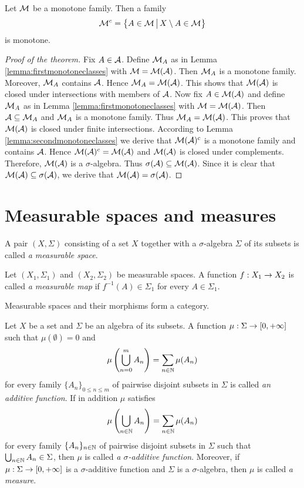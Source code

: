 \begin{lemma}\label{lemma:secondmonotoneclasses}
Let ${\mathcal M}$ be a monotone family. Then a family
$${\mathcal M}^c=\big\{A\in {\mathcal M}\,\big|\,X\setminus A\in {\mathcal M}\big\}$$
is monotone.
\end{lemma}

\begin{proof}[Proof of the theorem]
Fix $A\in {\mathcal A}$. Define ${\mathcal M}_A$ as in Lemma \ref{lemma:firstmonotoneclasses} with ${\mathcal M} = {\mathcal M}({\mathcal A})$. Then ${\mathcal M}_A$ is a monotone family. Moreover, ${\mathcal M}_A$ contains ${\mathcal A}$. Hence ${\mathcal M}_A={\mathcal M}({\mathcal A})$. This shows that ${\mathcal M}({\mathcal A})$ is closed under intersections with members of ${\mathcal A}$. Now fix $A\in {\mathcal M}({\mathcal A})$ and define ${\mathcal M}_A$ as in Lemma \ref{lemma:firstmonotoneclasses} with ${\mathcal M} = {\mathcal M}({\mathcal A})$. Then ${\mathcal A}\subseteq {\mathcal M}_A$ and ${\mathcal M}_A$ is a monotone family. Thus ${\mathcal M}_A={\mathcal M}({\mathcal A})$. This proves that ${\mathcal M}({\mathcal A})$ is closed under finite intersections. According to Lemma \ref{lemma:secondmonotoneclasses} we derive that ${\mathcal M}({\mathcal A})^c$ is a monotone family and contains ${\mathcal A}$. Hence ${\mathcal M}({\mathcal A})^c={\mathcal M}({\mathcal A})$ and ${\mathcal M}({\mathcal A})$ is closed under complements. Therefore, ${\mathcal M}({\mathcal A})$ is a $\sigma$-algebra. Thus $\sigma({\mathcal A})\subseteq {\mathcal M}({\mathcal A})$. Since it is clear that ${\mathcal M}({\mathcal A})\subseteq \sigma({\mathcal A})$, we derive that ${\mathcal M}({\mathcal A})=\sigma({\mathcal A})$.
\end{proof}

\section{Measurable spaces and measures}

\begin{definition}
A pair $(X,\Sigma)$ consisting of a set $X$ together with a $\sigma$-algebra $\Sigma$ of its subsets is called \textit{a measurable space}.
\end{definition}

\begin{definition}
Let $(X_1,\Sigma_1)$ and $(X_2,\Sigma_2)$ be measurable spaces. A function $f:X_1\rightarrow X_2$ is called \textit{a measurable map} if $f^{-1}(A)\in \Sigma_1$ for every $A\in \Sigma_1$.
\end{definition}
\noindent
Measurable spaces and their morphisms form a category. 

\begin{definition}
Let $X$ be a set and $\Sigma$ be an algebra of its subsets. A function $\mu:\Sigma \rightarrow [0,+\infty]$ such that $\mu(\emptyset)=0$ and 
$$\mu\left(\bigcup_{n=0}^mA_n\right)=\sum_{n\in {\mathbb N}}\mu(A_n)$$
for every family  $\{A_n\}_{0\leq n\leq m}$ of pairwise disjoint subsets in $\Sigma$ is called \textit{an additive function}. If in addition $\mu$ satisfies
$$\mu\left(\bigcup_{n\in {\mathbb N}}A_n\right)=\sum_{n\in {\mathbb N}}\mu(A_n)$$
for every family  $\{A_n\}_{n\in {\mathbb N}}$ of pairwise disjoint subsets in $\Sigma$ such that $\bigcup_{n\in {\mathbb N}}A_n\in \Sigma$, then $\mu$ is called \textit{a $\sigma$-additive function}. Moreover, if $\mu:\Sigma \rightarrow [0,+\infty]$ is a $\sigma$-additive function and $\Sigma$ is a $\sigma$-algebra, then $\mu$ is called \textit{a measure}. 
\end{definition}

